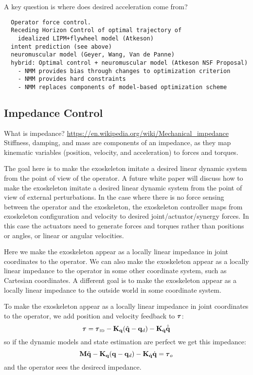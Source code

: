 \documentclass[letterpaper,12pt,fullpage]{article}
\newcommand{\invdyn}{{\mbox {\tiny ID}}}
\begin{document}
A key question is where does desired acceleration come from?
\begin{verbatim}
  Operator force control.
  Receding Horizon Control of optimal trajectory of 
    idealized LIPM+flywheel model (Atkeson)
  intent prediction (see above)
  neuromuscular model (Geyer, Wang, Van de Panne)
  hybrid: Optimal control + neuromuscular model (Atkeson NSF Proposal)
    - NMM provides bias through changes to optimization criterion
    - NMM provides hard constraints
    - NMM replaces components of model-based optimization scheme
\end{verbatim}

\subsection{Impedance Control}

What is impedance?
\url{https://en.wikipedia.org/wiki/Mechanical_impedance}
Stiffness, damping, and mass are components of an impedance, as
they map kinematic variables (position, velocity, and acceleration)
to forces and torques.

The goal here is to make the exoskeleton imitate a desired linear dynamic system
from the point of view of the operator.
A future white paper will discuss how to make the exoskeleton 
imitate a desired linear dynamic system 
from the point of view of external perturbations.
In the case where there is no force sensing between the operator and the
exoskeleton, the exoskeleton controller maps from exoskeleton configuration
and velocity to desired joint/actuator/synergy forces.
In this case the actuators need to generate forces and torques rather than
positions or angles, or linear or angular velocities.

Here we make the exoskeleton appear as a locally linear impedance in joint
coordinates to the operator.
We can also make the exoskeleton appear as a locally linear impedance to the
operator in some other coordinate system, such as Cartesian coordinates.
A different goal is to make the exoskeleton appear as a locally linear impedance to
the outside world in some coordinate system.

To make the exoskeleton appear as a locally linear impedance in joint
coordinates to the operator, we add position and velocity feedback to $\vtau$:
\begin{equation}
\vtau = \vtau_{\invdyn} - \mK_{\vq} ( \hat{\vq} - \vq_d ) - \mK_{\dot{\vq}} \hat{\dot{\vq}}
\label{eq:impedance}
\end{equation}
so if the dynamic models and state estimation are perfect we get this impedance:
\begin{equation}
\mM \ddot{\vq} - \mK_{\vq} ( \vq - \vq_d ) - \mK_{\dot{\vq}} \dot{\vq} = \vtau_o
\end{equation}
and the operator sees the desirecd impedance.
\end{document}
